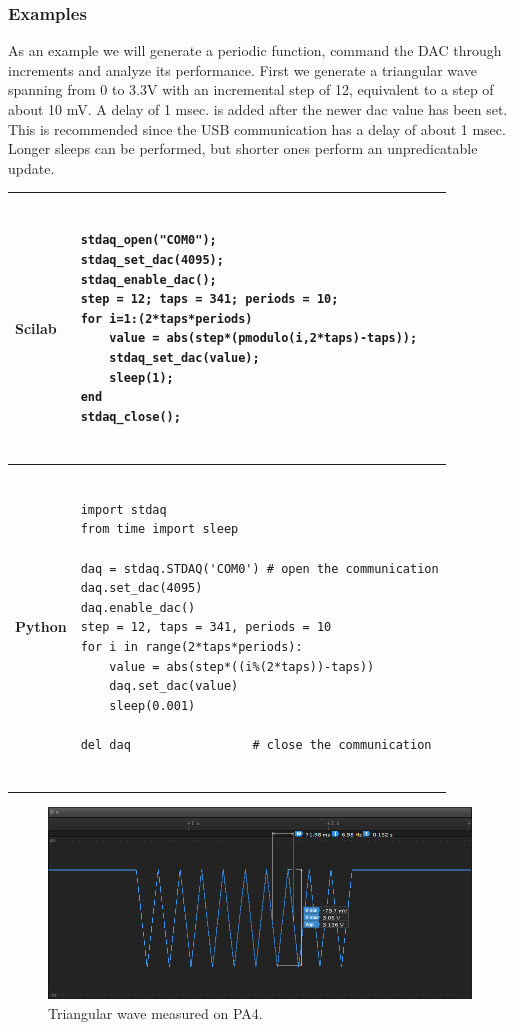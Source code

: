 \documentclass[letterpaper,10pt,english]{hitec}
\begin{document}
\subsubsection{Examples}

As an example we will generate a periodic function, command the DAC through increments and analyze its performance.
First we generate a triangular wave spanning from 0 to 3.3V with an incremental step of 12, equivalent to a step of about 10 mV. A delay of 1 msec. is added after the newer dac value has been set. This is recommended since the USB communication has a delay of about 1 msec. Longer sleeps can be performed, but shorter ones perform an unpredicatable update.
%
\begin{table}[ht!]
\begin{tabular}{|l|l|}
\hline
\cellcolor[HTML]{C0C0C0} \textbf{Scilab} & 
\begin{minipage}{4.5in}
\begin{verbatim}

stdaq_open("COM0");
stdaq_set_dac(4095);
stdaq_enable_dac();
step = 12; taps = 341; periods = 10;
for i=1:(2*taps*periods)
    value = abs(step*(pmodulo(i,2*taps)-taps));
    stdaq_set_dac(value);
    sleep(1);
end
stdaq_close();
    
\end{verbatim}
\end{minipage}
\\ \hline
\cellcolor[HTML]{C0C0C0} \textbf{Python} & 
\begin{minipage}{4.5in}
\begin{verbatim}

import stdaq
from time import sleep

daq = stdaq.STDAQ('COM0') # open the communication
daq.set_dac(4095)
daq.enable_dac()
step = 12, taps = 341, periods = 10
for i in range(2*taps*periods):
    value = abs(step*((i%(2*taps))-taps))
    daq.set_dac(value)
    sleep(0.001)

del daq                 # close the communication
    
\end{verbatim}
\end{minipage}
\\ \hline
\end{tabular}
\end{table}

\begin{figure}[ht!]
\includegraphics[scale=0.8]{../img/triangular_wave2.png}
\caption{Triangular wave measured on PA4.}
\label{fig:triangular_wave}
\end{figure}
\end{document}
